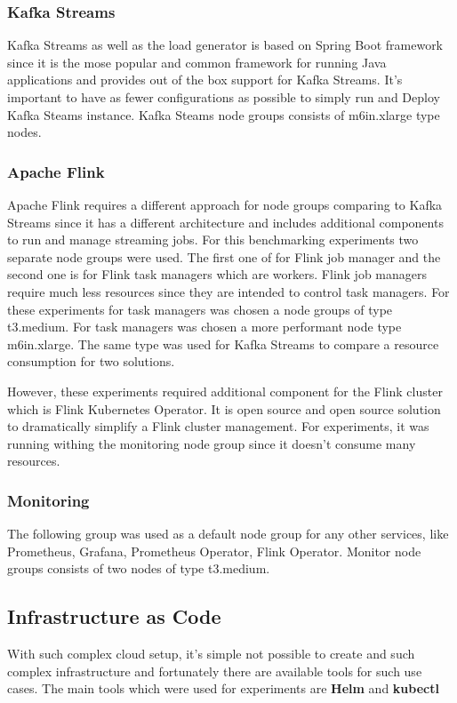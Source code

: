 \subsubsection{Kafka Streams}
Kafka Streams as well as the load generator is based on Spring Boot framework since it is
the mose popular and common framework for running Java applications and provides out of the box
support for Kafka Streams.
It's important to have as fewer configurations as possible to simply run and Deploy Kafka Steams
instance.
Kafka Steams node groups consists of m6in.xlarge type nodes.

\subsubsection{Apache Flink}
Apache Flink requires a different approach for node groups comparing to Kafka Streams since
it has a different architecture and includes additional components to run and manage streaming
jobs.
For this benchmarking experiments two separate node groups were used.
The first one of for Flink job manager and the second one is for Flink task managers which
are workers.
Flink job managers require much less resources since they are intended to control task managers.
For these experiments for task managers was chosen a node groups of type t3.medium.
For task managers was chosen a more performant node type m6in.xlarge.
The same type was used for Kafka Streams to compare a resource consumption for two solutions.

However, these experiments required additional component for the Flink cluster which is
Flink Kubernetes Operator.
It is open source and open source solution to dramatically simplify a Flink cluster management.
For experiments, it was running withing the monitoring node group since it doesn't consume
many resources.

\subsubsection{Monitoring}
The following group was used as a default node group for any other services, like Prometheus,
Grafana, Prometheus Operator, Flink Operator.
Monitor node groups consists of two nodes of type t3.medium.

\subsection{Infrastructure as Code}\label{subsec:infrastructure-as-code}
With such complex cloud setup, it's simple not possible to create and such
complex infrastructure and fortunately there are available tools for such use cases.
The main tools which were used for experiments are \textbf{Helm} and \textbf{kubectl}

